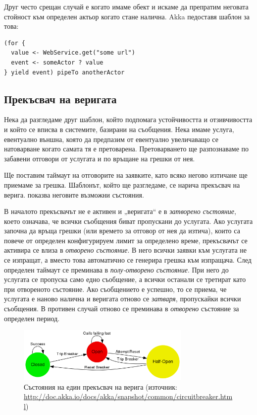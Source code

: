 Друг често срещан случай е когато имаме  обект и искаме да препратим неговата стойност към определен актьор когато стане налична. Akka педоставя  шаблон за това:

\begin{lstlisting}
(for {
  value <- WebService.get("some url")
  event <- someActor ? value
} yield event) pipeTo anotherActor
\end{lstlisting}

\subsection{Прекъсвач на веригата}

Нека да разгледаме друг шаблон, който подпомага устойчивостта и отзивчивостта и който се вписва в системите, базирани на съобщения. Нека имаме услуга, евентуално външна, която да предпазим от евентуално увеличаващо се натоварване когато самата тя е претоварена. Претоварването ще разпознаваме по забавени отговори от услугата и по връщане на грешки от нея.

Ще поставим таймаут на отговорите на заявките, като всяко негово изтичане ще приемаме за грешка. Шаблонът, който ще разгледаме, се нарича прекъсвач на верига.  показва неговите възможни състояния.

В началото прекъсвачът не е активен и „веригата“ е в \emph{затворено състояние}, което означава, че всички съобщения биват пропускани до услугата. Ако услугата започна да връща грешки (или времето за отговор от нея да изтича), които са повече от определен конфигурируем лимит за определено време, прекъсвачът се активира се влиза в \emph{отворено състояние}. В него всички заявки към услугата не се изпращат, а вместо това автоматично се генерира грешка към изпращача. След определен таймаут се преминава в \emph{полу-отворено състояние}. При него до услугата се пропуска само едно съобщение, а всички останали се третират като при отвореното състояние. Ако съобщението е успешно, то се приема, че услугата е наново налична и веригата отново се \emph{затваря}, пропускайки всички съобщения. В противен случай отново се преминава в \emph{отворено} състояние за определен период.

\begin{figure}
  \centering\includegraphics[width=0.75\textwidth]{images/circuit-breaker-states.png}
  \caption[Състояния на един прекъсвач на верига]{Състояния на един прекъсвач на верига (източник: \url{http://doc.akka.io/docs/akka/snapshot/common/circuitbreaker.html})}
  \label{fig:circuit-breaker-states}
\end{figure}

